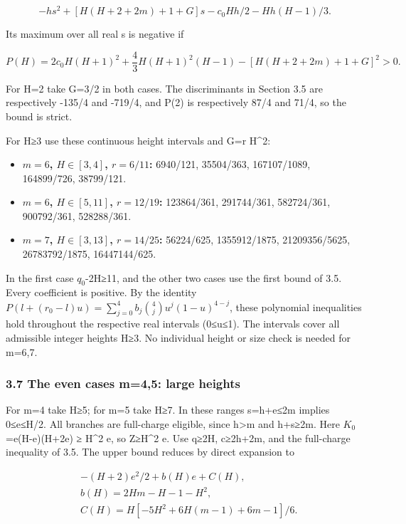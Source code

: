 \documentclass[
  10pt,
  a4paper,
]{article}
\providecommand{\tightlist}{%
  \setlength{\itemsep}{0pt}\setlength{\parskip}{0pt}}
\begin{document}
\[-hs^2+[H(H+2+2m)+1+G]s-c_0Hh/2-Hh(H-1)/3.\]

Its maximum over all real s is negative if

\[P(H)=2c_0H(H+1)^2+\frac43H(H+1)^2(H-1)-[H(H+2+2m)+1+G]^2>0.\]

For H=2 take G=3/2 in both cases. The discriminants in Section 3.5 are
respectively -135/4 and -719/4, and P(2) is respectively 87/4 and 71/4,
so the bound is strict.

For H≥3 use these continuous height intervals and G=r H\^{}2:

\begin{itemize}
\tightlist
\item
  \textbf{\(m=6\), \(H\in[3,4]\), \(r=6/11\):} 6940/121, 35504/363,
  167107/1089, 164899/726, 38799/121.
\item
  \textbf{\(m=6\), \(H\in[5,11]\), \(r=12/19\):} 123864/361, 291744/361,
  582724/361, 900792/361, 528288/361.
\item
  \textbf{\(m=7\), \(H\in[3,13]\), \(r=14/25\):} 56224/625,
  1355912/1875, 21209356/5625, 26783792/1875, 16447144/625.
\end{itemize}

In the first case \(q_0\)-2H≥11, and the other two cases use the first
bound of 3.5. Every coefficient is positive. By the identity
\(P(l+(r_0-l)u)=\sum_{j=0}^4 b_j\binom4j u^j(1-u)^{4-j}\), these
polynomial inequalities hold throughout the respective real intervals
(0≤u≤1). The intervals cover all admissible integer heights H≥3. No
individual height or size check is needed for m=6,7.

\subsubsection{3.7 The even cases m=4,5: large
heights}\label{the-even-cases-m45-large-heights}

For m=4 take H≥5; for m=5 take H≥7. In these ranges s=h+e≤2m implies
0≤e≤H/2. All branches are full-charge eligible, since h\textgreater m
and h+s≥2m. Here \(K_0\)=e(H-e)(H+2e) ≥ H\^{}2 e, so Z≥H\^{}2 e. Use
q≥2H, c≥2h+2m, and the full-charge inequality of 3.5. The upper bound
reduces by direct expansion to

\[\begin{aligned}&-(H+2)e^2/2+b(H)e+C(H),\\ &b(H)=2Hm-H-1-H^2,\\ &C(H)=H[-5H^2+6H(m-1)+6m-1]/6.\end{aligned}\]
\end{document}
